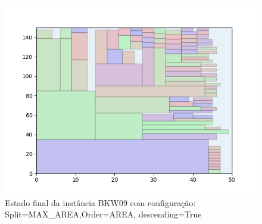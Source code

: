 \begin{figure}[H]
    \centering
    \caption[]{Estado final da instância BKW09 com configuração: Split=MAX_AREA,Order=AREA, descending=True}
    \label{fig:bkw09-max_area-area-true}
    \includegraphics[scale=0.5]{output/figures/bkw/bkw09/max_area/area/true/000}
\end{figure}